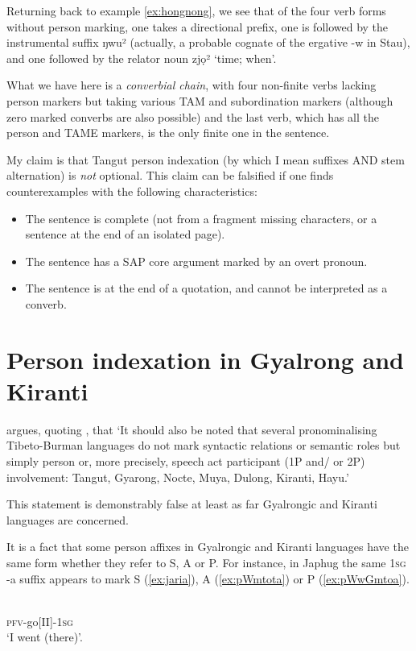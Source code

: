 \documentclass[oldfontcommands,oneside,a4paper,11pt]{article}
\newcommand{\ipa}[1]{{\phon \mbox{#1}}} %
\begin{document}
Returning back to example \ref{ex:hongnong}, we see that of the four verb forms without person marking, one takes a directional prefix, one is followed by the instrumental suffix  \ipa{ŋwu²} (actually, a probable cognate of the ergative \ipa{-w} in Stau), and one followed by the relator noun  \ipa{zjọ²} `time; when'. 

What we have here is a \textit{converbial chain}, with four non-finite verbs lacking person markers but taking various TAM and subordination markers (although zero marked converbs are also possible) and the last verb, which has all the person and TAME markers, is the only finite one in the sentence.

My claim is that Tangut person indexation (by which I mean suffixes AND stem alternation) is \textit{not} optional. This claim can be falsified if one finds counterexamples with the following characteristics:

\begin{itemize}
\item The sentence is complete (not from a fragment missing characters, or a sentence at the end of an isolated page).
\item The sentence has a SAP core argument marked by an overt pronoun.
\item The sentence is at the end of a quotation, and cannot be interpreted as a converb.
\end{itemize}

\section{Person indexation in Gyalrong and Kiranti} \label{sec:rgyalrong}
\citet[53]{zeisler15eat} argues, quoting \citet[308]{lapolla92}, that `It should also be noted that several pronominalising Tibeto-Burman languages do not mark syntactic relations or semantic roles but simply person or, more precisely, speech act participant (1P and/ or 2P) involvement: Tangut, Gyarong, Nocte, Muya, Dulong, Kiranti, Hayu.'

This statement is demonstrably false at least as far Gyalrongic and Kiranti languages are concerned.  

It is a fact that some person affixes in Gyalrongic and Kiranti languages have the same form whether they refer to S, A or P. For instance, in Japhug the same \textsc{1sg} \ipa{-a} suffix appears to mark S (\ref{ex:jaria}), A (\ref{ex:pWmtota}) or P (\ref{ex:pWwGmtoa}).

\begin{exe}
\ex \label{ex:jaria}
\gll \ipa{jɤ-ari-a} \\
\textsc{pfv}-go[II]-\textsc{1sg} \\
\glt `I went (there)'.
\end{exe}
\end{document}
